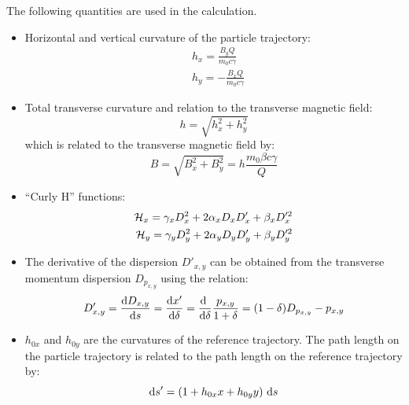 The following quantities are used in the calculation.
\begin{itemize}
\item Horizontal and vertical curvature of the particle trajectory:
\begin{align}
    &h_x = \frac{B_y Q}{m_0 c \gamma}    \label{eq:curvx}\\
    &h_y = -\frac{B_x Q}{m_0 c \gamma}   \label{eq:curvy}
\end{align}
\item Total transverse curvature and relation to the transverse magnetic field:
\begin{equation}
    h = \sqrt{h_x^2 + h_y^2}
\end{equation}
which is related to the transverse magnetic field by:
\begin{equation}
    B = \sqrt{B_x^2 + B_y^2}  = h  \frac{m_0 \beta c \gamma}{Q}
    \label{eq:btocurv}
\end{equation}
\item ``Curly H'' functions:
\begin{align}
    \mathcal{H}_x = \gamma_x D_x^2 + 2 \alpha_x D_x D_x' + \beta_x D_x'^2\\
    \mathcal{H}_y = \gamma_y D_y^2 + 2 \alpha_y D_y D_y' + \beta_y D_y'^2
\end{align}
\item The derivative of the dispersion $D'_{x,y}$ can be obtained from the transverse
momentum dispersion $D_{p_{x,y}}$ using the relation:
\begin{equation}
    D'_{x,y} = \frac{\text{d} {D_{x,y}}}{\text{d} {s}} = \frac{\text{d} {x'}}{\text{d} {\delta}} =
      \frac{\text{d} {~}}{\text{d} {\delta}} \frac{p_{x,y}}{1+\delta} = (1 - \delta)D_{p_{x,y}} - p_{x,y}
    \label{eq:ddispder}
\end{equation}
\item $h_{0x}$ and $h_{0y}$ are the curvatures of the reference trajectory. The path
length on the particle trajectory is related to the path length on the reference trajectory by:
\begin{equation}
    \text{d} s' = (1 + h_{0x}x + h_{0y}y)\ \text{d} s
    \label{eq:pathlength}
\end{equation}
\end{itemize}

